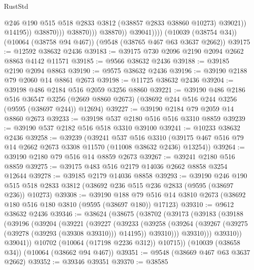 \begin{lexlean}{RustStd}
\begin{coremodule}
                                    @246
                                    @190
                                    @515
                                    @518
                                    @2833
                                    @3812
                                    (@38857 @2833 @38860 @10273)
                                    @39021))
                                @14195))
                            @38870)))
                      @38870)))
                @38870))
            @39041))))
    (@10039 (@38754 @34))
    (@10064 (@38758 @94 @467))
    (@9548 (@38765 @467 @63 @3637 @2662))
@39175 := @12592 @38632 @2436
@39183 := @39175 @730 @2096 @2190 @2094 @2662 @8863 @4142 @11571
@39185 := @9566 @38632 @2436
@39188 := @39185 @2190 @2094 @8863
@39190 := @9575 @38632 @2436
@39196 := @39190 @2188 @79 @2060 @14 @8861 @2673
@39198 := @11725 @38632 @2436
@39204 := @39198 @486 @2184 @516 @2059 @3256 @8860
@39221 := @39190
    @486
    @2186
    @516
    @36547
    @3256
    (@2669 @8860 @2673)
    (@38692 @244 @516 @244 @3256 (@9595 (@38697 @244)) @12694)
@39227 := @39190 @2184 @79 @2059 @14 @8860 @2673
@39233 := @39198 @537 @2180 @516 @516 @3310 @8859
@39239 := @39190 @537 @2182 @516 @518 @3310 @39100
@39241 := @10233 @38632 @2436
@39258 := @39239
    (@39241
      @537
      @516
      @3310
      (@39175 @467 @516 @79 @14 @2662 @2673 @3308 @11570 (@11008 @38632 @2436) @13254))
@39264 := @39190 @2180 @79 @516 @14 @8859 @2673
@39267 := @39241 @2180 @516 @8859
@39275 := @39175 @483 @516 @2179 @14036 @2662 @8858 @3254 @12644
@39278 := @39185 @2179 @14036 @8858
@39293 := @39190
    @246
    @190
    @515
    @518
    @2833
    @3812
    (@38692 @236 @515 @236 @2833 (@9595 (@38697 @236)) @10273)
@39308 := @39190
    @188
    @79
    @516
    @14
    @3810
    @2673
    (@38692 @180 @516 @180 @3810 (@9595 (@38697 @180)) @17123)
@39310 := @9612 @38632 @2436
@39346 := @38624
    (@38675
      (@38702
        (@39173
          (@39183
            (@39188
              (@39196
                (@39204
                  (@39221
                    (@39227
                      (@39233
                        (@39258
                          (@39264
                            (@39267 (@39275 (@39278 (@39293 (@39308 @39310))) @14195))
                            @39310)))
                      @39310)))
                @39310))
            @39041))
        @10702
        (@10064 (@17198 @2236 @312))
        @10715))
    (@10039 (@38658 @34))
    (@10064 (@38662 @94 @467))
@39351 := @9548 (@38669 @467 @63 @3637 @2662)
@39352 := @39346 @39351
@39370 := @38585

\end{coremodule}
\end{lexlean}
